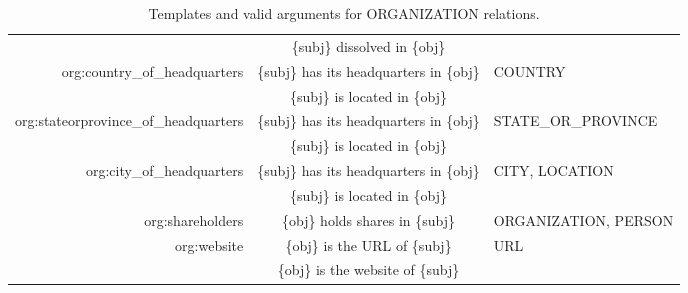 \documentclass[11pt]{article}
\begin{document}
\begin{table*}
{\begin{tabular}{rcl}
             & \{subj\} dissolved in \{obj\} & \\
            org:country\_of\_headquarters & \{subj\} has its headquarters in \{obj\} & COUNTRY \\
             & \{subj\} is located in \{obj\} & \\
            org:stateorprovince\_of\_headquarters & \{subj\} has its headquarters in \{obj\} & STATE\_OR\_PROVINCE \\
             & \{subj\} is located in \{obj\} & \\
             org:city\_of\_headquarters & \{subj\} has its headquarters in \{obj\} & CITY, LOCATION \\
             & \{subj\} is located in \{obj\} & \\
            org:shareholders & \{obj\} holds shares in \{subj\} & ORGANIZATION, PERSON \\
            org:website & \{obj\} is the URL of \{subj\} & URL \\
             & \{obj\} is the website of \{subj\} & \\
            \bottomrule
        \end{tabular}
    }
    \caption{Templates and valid arguments for ORGANIZATION relations.}
    \label{tab:org_templates}
\end{table*}
\end{document}
